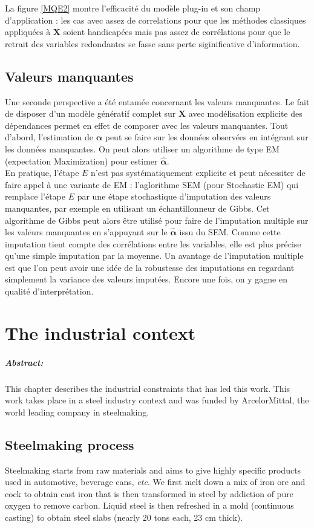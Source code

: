 \documentclass[12pt,a4paper]{report}
\begin{document}
	La figure \ref{MQE2} montre l'efficacité du modèle plug-in et son champ d'application : les cas avec assez de correlations pour que les méthodes classiques appliquées à $\boldsymbol{X}$ soient handicapées mais pas assez de corrélations pour que le retrait des variables redondantes se fasse sans perte siginificative d'information.
		
	\section{Valeurs manquantes}
		Une seconde perspective a été entamée concernant les valeurs manquantes. Le fait de disposer d'un modèle génératif complet sur $\boldsymbol{X}$ avec modélisation explicite des dépendances permet en effet de composer avec les valeurs manquantes. Tout d'abord, l'estimation de $\boldsymbol{\alpha}$ peut se faire sur les données observées en intégrant sur les données manquantes. On peut alors utiliser un algorithme de type EM (expectation Maximization) pour estimer $\hat{\boldsymbol{\alpha}}$.\\
		 
		 En pratique, l'étape $E$ n'est pas systématiquement explicite et peut nécessiter de faire appel à une variante de EM : l'aglorithme SEM (pour Stochastic EM) qui remplace l'étape $E$ par une étape stochastique d'imputation des valeurs manquantes, par exemple en utilisant un échantillonneur de Gibbs. Cet algorithme de Gibbs peut alors être utilisé pour faire de l'imputation multiple sur les valeurs manquantes en s'appuyant sur le $\hat{\boldsymbol{\alpha}}$ issu du SEM. Comme cette imputation tient compte des corrélations entre les variables, elle est plus précise qu'une simple imputation par la moyenne. Un avantage de l'imputation multiple est que l'on peut avoir une idée de la robustesse des imputations en regardant simplement la variance des valeurs imputées. Encore une fois, on y gagne en qualité d'interprétation.  
\chapter{The industrial context}
	\paragraph{Abstract:} This chapter describes the industrial constraints that has led this work. This work takes place in a steel industry context and was funded by ArcelorMittal, the world leading company in steelmaking. 
\section{Steelmaking process}
	Steelmaking starts from raw materials and aims to give highly specific products used in automotive, beverage cans, {\it etc}.
	We first melt down a mix of iron ore and cock to obtain cast iron that is then transformed in steel by addiction of pure oxygen to remove carbon. Liquid steel is then refreshed in a mold (continuous casting) to obtain steel slabs (nearly 20 tons each, 23 cm thick). \\
	
\end{document}

